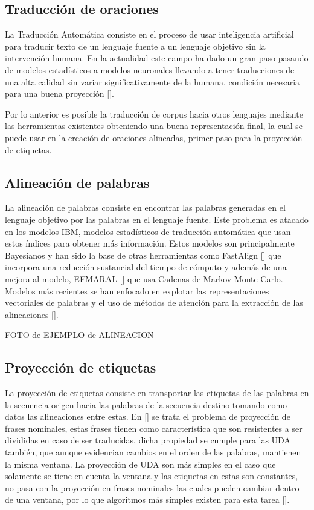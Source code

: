 \subsection{Traducción de oraciones}

La Traducción Automática consiste en el proceso de usar inteligencia artificial para
traducir texto de un lenguaje fuente a un lenguaje objetivo sin la intervención humana.
En la actualidad este campo ha dado un gran paso pasando de modelos estadísticos a modelos
neuronales llevando a tener traducciones de una alta calidad sin variar significativamente de la humana, 
condición necesaria para una buena proyección [\cite{eger2018cross}].

Por lo anterior es posible la traducción de corpus hacia otros lenguajes mediante las
herramientas existentes obteniendo una buena representación final, la cual se puede usar en la creación de
oraciones alineadas, primer paso para la proyección de etiquetas.

\subsection{Alineación de palabras}

La alineación de palabras consiste en encontrar las palabras generadas en el lenguaje objetivo por las 
palabras en el lenguaje fuente.
Este problema es atacado en los modelos IBM, modelos estadísticos de traducción automática que usan estos 
índices para obtener más información. Estos modelos son principalmente Bayesianos y han sido la base de
otras herramientas como FastAlign [\cite{dyer2013fastalign}] que incorpora una reducción sustancial del
tiempo de cómputo y además de una mejora al modelo, EFMARAL [\cite{ostling2016efficient}] que usa
Cadenas de Markov Monte Carlo. Modelos más recientes se han enfocado en explotar las representaciones
vectoriales de palabras y el uso de métodos de atención para la extracción de las
alineaciones [\cite{dou2021word}].

FOTO de EJEMPLO de ALINEACION

\subsection{Proyección de etiquetas}

La proyección de etiquetas consiste en transportar las etiquetas de las palabras en la secuencia origen
hacia las palabras de la secuencia destino tomando como datos las alineaciones entre estas. En [\cite{yarowsky2001inducing}]
se trata el problema de proyección de frases nominales, estas frases tienen como característica que son resistentes
a ser divididas en caso de ser traducidas, dicha propiedad se cumple para las UDA también, que aunque evidencian 
cambios en el orden de las palabras, mantienen la misma ventana. La proyección de UDA son más simples en el caso
que solamente se tiene en cuenta la ventana y las etiquetas en estas son constantes, no pasa con la proyección en
frases nominales las cuales pueden cambiar dentro de una ventana, por lo que algoritmos más simples existen
para esta tarea [\cite{eger2018cross}].

